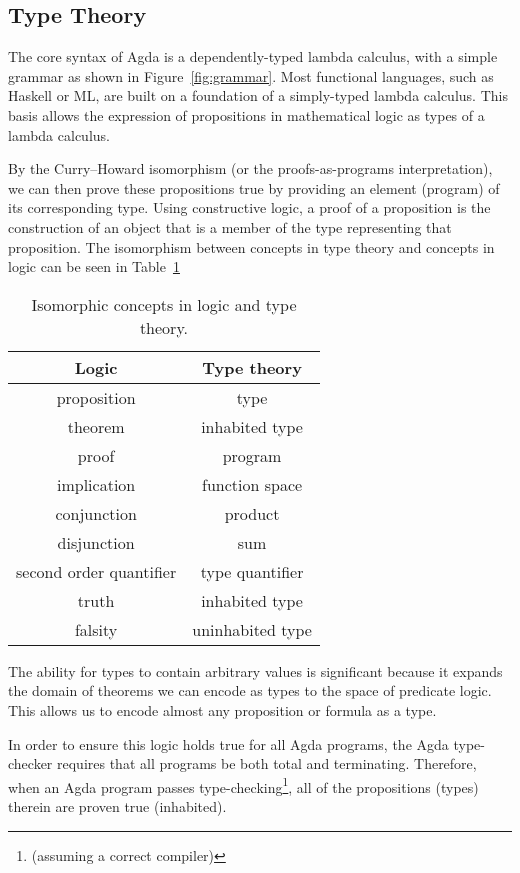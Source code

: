 

\subsection{Type Theory}
The core syntax of Agda is a dependently-typed lambda calculus, with a simple grammar as shown in Figure~\ref{fig:grammar}. Most functional languages, such as Haskell or ML, are built on a foundation of a simply-typed lambda calculus. This basis allows the expression of propositions in mathematical logic as types of a lambda calculus.

By the Curry–Howard isomorphism (or the proofs-as-programs interpretation), we can then prove these propositions true by providing an element (program) of its corresponding type.\citep{poernomo2005} Using constructive logic, a proof of a proposition is the construction of an object that is a member of the type representing that proposition. The isomorphism between concepts in type theory and concepts in logic can be seen in Table~\ref{table:curry_howard}

\begin{table}
\begin{center}
\begin{tabular}{c|c}
Logic & Type theory \\
\hline
proposition & type\\
theorem & inhabited type\\
proof & program\\
implication & function space\\
conjunction & product\\
disjunction & sum\\
second order quantifier & type quantifier\\
truth & inhabited type\\
falsity & uninhabited type\\
\end{tabular}
\end{center}
\caption{Isomorphic concepts in logic and type theory.}
\label{table:curry_howard}
\end{table}

The ability for types to contain arbitrary values is significant because it expands the domain of theorems we can encode as types to the space of predicate logic. This allows us to encode almost any proposition or formula as a type.

 In order to ensure this logic holds true for all Agda programs, the Agda type-checker requires that all programs be both total and terminating.\citep{norell2009} Therefore, when an Agda program passes type-checking\footnote{(assuming a correct compiler)}, all of the propositions (types) therein are proven true (inhabited).

